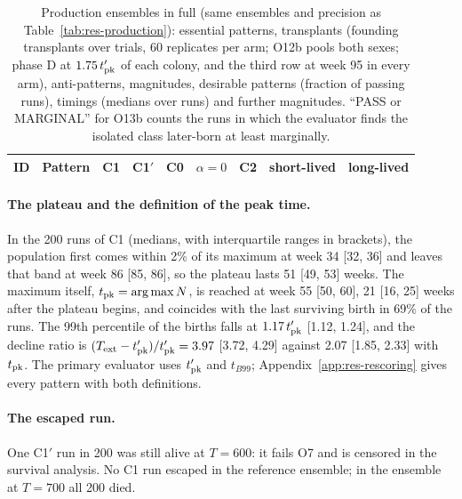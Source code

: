 \begin{table}[ht]
\centering
\caption{Production ensembles in full (same ensembles and precision as Table~\ref{tab:res-production}): essential
patterns, transplants (founding transplants over trials, 60 replicates per arm; O12b pools both sexes; phase D at
$1.75\,t'_{\rm pk}$ of each colony, and the third row at week 95 in every arm), anti-patterns, magnitudes, desirable
patterns (fraction of passing runs), timings (medians over runs) and further magnitudes. ``PASS or MARGINAL'' for
O13b counts the runs in which the evaluator finds the isolated class later-born at least marginally.}
\label{tab:res-production-si}
\scriptsize
\setlength{\tabcolsep}{3pt}
\begin{tabular}{@{}llccccccc@{}}
\toprule
ID & Pattern & \textsf{C1} & \textsf{C1}$'$ & \textsf{C0} & $\alpha{=}0$ & \textsf{C2} & short-lived & long-lived \\
\midrule


\end{tabular}
\end{table}

\paragraph{The plateau and the definition of the peak time.}
In the 200 runs of \textsf{C1} (medians, with interquartile ranges in brackets), the population first comes within
2\% of its maximum at week 34 [32, 36] and leaves that band at week 86 [85, 86], so the plateau lasts 51 [49, 53]
weeks. The maximum itself, $t_{\rm pk}=\arg\max N$, is reached at week 55 [50, 60], 21 [16, 25] weeks after the
plateau begins, and coincides with the last surviving birth in 69\% of the runs. The 99th percentile of the births
falls at $1.17\,t'_{\rm pk}$ [1.12, 1.24], and the decline ratio is $(T_{\rm ext}-t'_{\rm pk})/t'_{\rm pk}=3.97$
[3.72, 4.29] against 2.07 [1.85, 2.33] with $t_{\rm pk}$. The primary evaluator uses $t'_{\rm pk}$ and
$t_{B99}$; Appendix~\ref{app:res-rescoring} gives every pattern with both definitions.

\paragraph{The escaped run.}
One \textsf{C1}$'$ run in 200 was still alive at $T=600$: it fails O7 and is censored in the survival analysis. No
\textsf{C1} run escaped in the reference ensemble; in the ensemble at $T=700$ all 200 died.

